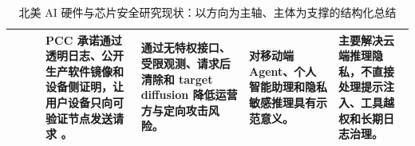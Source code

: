 \begin{table}[htbp]
\begin{tabularx}{\textwidth}{|>{\centering\arraybackslash}p{0.9cm}|>{\centering\arraybackslash}p{1.8cm}|>{\raggedright\arraybackslash}p{2.1cm}|X|X|X|X|}
\cline{4-7}
& & &
PCC 承诺通过透明日志、公开生产软件镜像和设备侧证明，让用户设备只向可验证节点发送请求 \cite{applepcc2024}。 &
通过无特权接口、受限观测、请求后清除和 target diffusion 降低运营方与定向攻击风险。 &
对移动端 Agent、个人智能助理和隐私敏感推理具有示范意义。 &
主要解决云端推理隐私，不直接处理提示注入、工具越权和长期日志治理。 \\
\hline
\end{tabularx}
\caption{北美 AI 硬件与芯片安全研究现状：以方向为主轴、主体为支撑的结构化总结}
\label{tab:north-america-ai-hardware-security-formatted}
\end{table}

